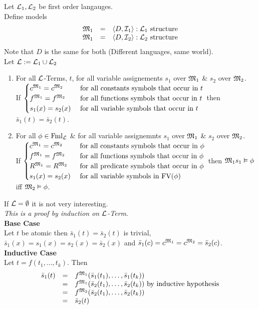 \documentclass[11pt,a4paper]{article}
\begin{document}
\theorem{}
Let $\mathcal{L}_1,\mathcal{L}_2$ be first order langauges.\\
Define models
\[\begin{array}{rcl}
\mathfrak{M}_1&=&\langle D,\mathcal{I}_1\rangle:\mathcal{L}_1\text{ structure}\\
\mathfrak{M}_1&=&\langle D,\mathcal{I}_2\rangle:\mathcal{L}_2\text{ structure}
\end{array}\]
Note that $D$ is the same for both (\ie Different languages, same world).\\
Let $\mathcal{L}:=\mathcal{L}_1\cup\mathcal{L}_2$
\begin{enumerate}
	\item For all $\mathcal{L}$-Terms, $t$, for all variable assignements $s_1$ over $\mathfrak{M}_1$ \& $s_2$ over $\mathfrak{M}_2$.\\
	If $\begin{cases}c^{\mathfrak{M}_1}=c^{\mathfrak{M}_2}&\text{ for all constants symbols that occur in }t\\f^{\mathfrak{M}_1}=f^{\mathfrak{M}_2}&\text{ for all functions symbols that occur in }t\\s_1(x)=s_2(x)&\text{ for all variable symbols that occur in }t\end{cases}$ then $\bar{s}_1(t)=\bar{s}_2(t)$.
	\item For all $\phi\in\text{Fml}_{\mathcal{L}}$ \& for all variable assignemnts $s_1$ over $\mathfrak{M}_1$ \& $s_2$ over $\mathfrak{M}_2$.\\
	If $\begin{cases}c^{\mathfrak{M}_1}=c^{\mathfrak{M}_2}&\text{ for all constants symbols that occur in }\phi\\f^{\mathfrak{M}_1}=f^{\mathfrak{M}_2}&\text{ for all functions symbols that occur in }\phi\\R^{\mathfrak{M}_1}=R^{\mathfrak{M}_2}&\text{ for all predicate symbols that occur in }\phi\\s_1(x)=s_2(x)&\text{ for all variable symbols in FV}(\phi)\end{cases}$ then $\mathfrak{M}_1s_1\vDash\phi$ iff $\mathfrak{M}_2\vDash\phi$.\\
\end{enumerate}
\nb If $\mathcal{L}=\emptyset$ it is not very interesting.\\

\textit{This is a proof by induction on $\mathcal{L}$-Term}.\\
\textbf{Base Case}\\
Let $t$ be atomic then $\bar{s}_1(t)=\bar{s}_2(t)$ is trivial, $\bar{s}_1(x)=s_1(x)=s_2(x)=\bar{s}_2(x)$ and $\bar{s}_1(c)=c^{\mathfrak{M}_1}=c^{\mathfrak{M}_2}=\bar{s}_2(c)$.\\
\textbf{Inductive Case}\\
Let $t=f(t_1,\dots,t_k)$. Then
\[\begin{array}{rcl}
\bar{s}_1(t)&=&f^{\mathfrak{M}_1}(\bar{s}_1(t_1),\dots,\bar{s}_1(t_k))\\
&=&f^{\mathfrak{M}_1}(\bar{s}_2(t_1),\dots,\bar{s}_2(t_k))\text{ by inductive hypothesis}\\
&=&f^{\mathfrak{M}_2}(\bar{s}_2(t_1),\dots,\bar{s}_2(t_k))\\
&=&\bar{s}_2(t)
\end{array}\]\proved
\end{document}
